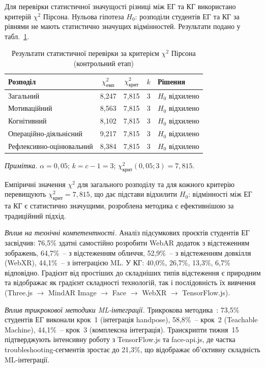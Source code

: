 Для перевірки статистичної значущості різниці між ЕГ та КГ використано критерій $\chi^2$ Пірсона. Нульова гіпотеза $H_0$: розподіли студентів ЕГ та КГ за рівнями не мають статистично значущих відмінностей. Результати подано у табл.~\ref{tab:chi2_summary}.

\begin{table}[!h]
\caption{Результати статистичної перевірки за критерієм $\chi^2$ Пірсона (контрольний етап)}
\label{tab:chi2_summary}
\centering
\small
\begin{tabular}{|l|c|c|c|l|}
\hline
\hfill \textbf{Розподіл} & $\chi^2_{\text{емп}}$ & $\chi^2_{\text{крит}}$ & $k$ &\hfill  \textbf{Рішення} \\
\hline
Загальний & 8,247 & 7,815 & 3 & $H_0$ відхилено \\
\hline
Мотиваційний & 8,563 & 7,815 & 3 & $H_0$ відхилено \\
\hline
Когнітивний & 8,102 & 7,815 & 3 & $H_0$ відхилено \\
\hline
Операційно-діяльнісний & 9,217 & 7,815 & 3 & $H_0$ відхилено \\
\hline
Рефлексивно-оцінювальний & 8,384 & 7,815 & 3 & $H_0$ відхилено \\
\hline
\end{tabular}

\medskip
\footnotesize
\textit{Примітка.} $\alpha = 0{,}05$; $k = c - 1 = 3$; $\chi^2_{\text{крит}}(0{,}05; 3) = 7{,}815$.
\end{table}

Емпіричні значення $\chi^2$ для загального розподілу та для кожного критерію перевищують $\chi^2_{\text{крит}} = 7{,}815$, що дає підстави відхилити $H_0$: відмінності між ЕГ та КГ є статистично значущими, розроблена методика є ефективнішою за традиційний підхід.


\textit{Вплив на технічні компетентності.} Аналіз підсумкових проєктів студентів ЕГ засвідчив: 76,5\% здатні самостійно розробити WebAR додаток з відстеженням зображень, 64,7\%~-- з відстеженням обличчя, 52,9\%~-- з відстеженням довкілля (WebXR), 44,1\%~-- з інтеграцією ML. У КГ: 40,0\%, 26,7\%, 13,3\%, 6,7\% відповідно. Градієнт від простіших до складніших типів відстеження є природним та відображає як градієнт складності технологій, так і послідовність їх вивчення (Three.js $\to$ MindAR Image $\to$ Face $\to$ WebXR $\to$ TensorFlow.js).

\textit{Вплив трикрокової методики ML-інтеграції.} Трикрокова методика~\cite{Semerikov2024WebARML_CoSinE, Semerikov2024WebAR_EduDim}: 73,5\% студентів ЕГ виконали крок~1 (інтеграція handpose), 58,8\%~-- крок~2 (Teachable Machine), 44,1\%~-- крок~3 (комплексна інтеграція). Транскрипти тижня~15 підтверджують інтенсивну роботу з TensorFlow.js та face-api.js, де частка troubleshooting-сегментів зростає до 21,3\%, що відображає об'єктивну складність ML-інтеграції.

